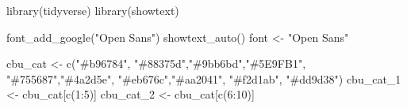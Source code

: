 \documentclass[
  letterpaper,
  DIV=11,
  numbers=noendperiod]{scrreprt}
\newenvironment{Shaded}{\begin{snugshade}}{\end{snugshade}}
\newcommand{\DecValTok}[1]{\textcolor[rgb]{0.68,0.00,0.00}{#1}}
\newcommand{\FunctionTok}[1]{\textcolor[rgb]{0.28,0.35,0.67}{#1}}
\newcommand{\NormalTok}[1]{\textcolor[rgb]{0.00,0.23,0.31}{#1}}
\newcommand{\OtherTok}[1]{\textcolor[rgb]{0.00,0.23,0.31}{#1}}
\newcommand{\SpecialCharTok}[1]{\textcolor[rgb]{0.37,0.37,0.37}{#1}}
\newcommand{\StringTok}[1]{\textcolor[rgb]{0.13,0.47,0.30}{#1}}
\begin{document}
\begin{Shaded}
\begin{Highlighting}[]
\FunctionTok{library}\NormalTok{(tidyverse)}
\FunctionTok{library}\NormalTok{(showtext)}

\FunctionTok{font\_add\_google}\NormalTok{(}\StringTok{"Open Sans"}\NormalTok{)}
\FunctionTok{showtext\_auto}\NormalTok{()}
\NormalTok{font }\OtherTok{\textless{}{-}} \StringTok{"Open Sans"}


\NormalTok{cbu\_cat }\OtherTok{\textless{}{-}} \FunctionTok{c}\NormalTok{(}\StringTok{"\#b96784"}\NormalTok{, }\StringTok{"\#88375d"}\NormalTok{,}\StringTok{"\#9bb6bd"}\NormalTok{,}\StringTok{"\#5E9FB1"}\NormalTok{, }\StringTok{"\#755687"}\NormalTok{,}\StringTok{"\#4a2d5e"}\NormalTok{, }\StringTok{"\#eb676c"}\NormalTok{,}\StringTok{"\#aa2041"}\NormalTok{, }\StringTok{"\#f2d1ab"}\NormalTok{, }\StringTok{"\#dd9d38"}\NormalTok{)}
\NormalTok{cbu\_cat\_1 }\OtherTok{\textless{}{-}}\NormalTok{ cbu\_cat[}\FunctionTok{c}\NormalTok{(}\DecValTok{1}\SpecialCharTok{:}\DecValTok{5}\NormalTok{)]}
\NormalTok{cbu\_cat\_2 }\OtherTok{\textless{}{-}}\NormalTok{ cbu\_cat[}\FunctionTok{c}\NormalTok{(}\DecValTok{6}\SpecialCharTok{:}\DecValTok{10}\NormalTok{)]}


\end{Highlighting}
\end{Shaded}
\end{document}
